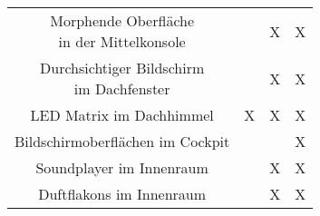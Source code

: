 \begin{table}[hbt]
\begin{tabular}{c|ccc}
		\parbox[t]{0.4\linewidth}{\centering Morphende Oberfläche\\in der Mittelkonsole} &  & X & X \\
		\parbox[t]{0.4\linewidth}{\centering Durchsichtiger Bildschirm\\im Dachfenster} &  & X & X \\
		LED Matrix im Dachhimmel & X & X & X \\
		\parbox[t]{0.4\linewidth}{\centering Bildschirmoberflächen im Cockpit} &  &  & X \\
		\parbox[t]{0.4\linewidth}{\centering Soundplayer im Innenraum} &  & X & X \\
		\parbox[t]{0.4\linewidth}{\centering Duftflakons im Innenraum} &  & X & X \\
	\end{tabular} 
\end{table}
